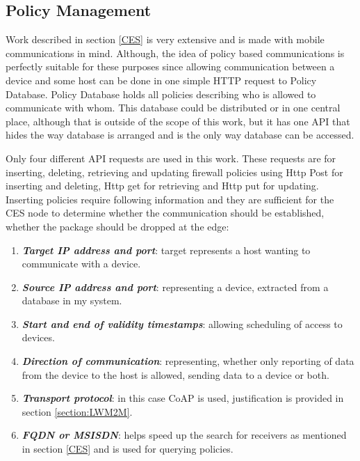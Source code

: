 \subsection{Policy Management}
\label{policyManagement}

Work described in section \ref{CES} is very extensive and is made with mobile communications in mind. Although, the idea of policy based communications is perfectly suitable for these purposes since allowing communication between a device and some host can be done in one simple HTTP request to Policy Database. Policy Database holds all policies describing who is allowed to communicate with whom. This database could be distributed or in one central place, although that is outside of the scope of this work, but it has one API that hides the way database is arranged and is the only way database can be accessed. 

Only four different API requests are used in this work. These requests are for inserting, deleting, retrieving and updating firewall policies using Http Post for inserting and deleting, Http get for retrieving and Http put for updating. Inserting policies require following information and they are sufficient for the CES node to determine whether the communication should be established, whether the package should be dropped at the edge: 

\begin{enumerate}
	\setlength{\itemsep}{1pt}
	\item \textbf{\textit{Target IP address and port}}: target represents a host wanting to communicate with a device.
	\item \textbf{\textit{Source IP address and port}}: representing a device, extracted from a database in my system.
	\item \textbf{\textit{Start and end of validity timestamps}}: allowing scheduling of access to devices.
	\item \textbf{\textit{Direction of communication}}: representing, whether only reporting of data from the device to the host is allowed, sending data to a device or both.
	\item \textbf{\textit{Transport protocol}}: in this case CoAP is used, justification is provided in section \ref{section:LWM2M}.
	\item \textbf{\textit{FQDN or MSISDN}}: helps speed up the search for receivers as mentioned in section \ref{CES} and is used for querying policies.
\end{enumerate}


